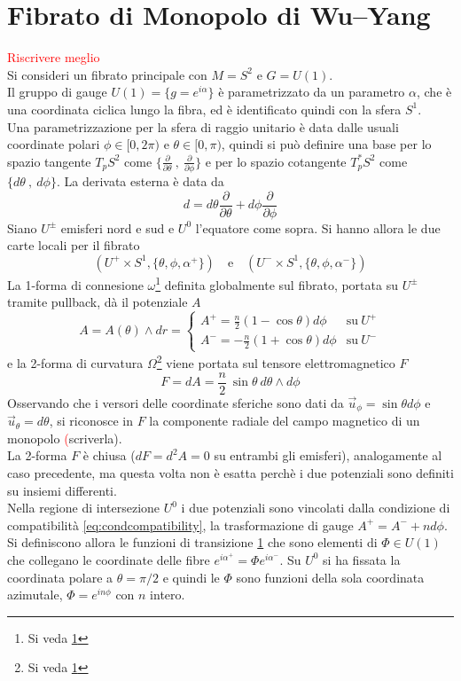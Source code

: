 \section{Fibrato di Monopolo di Wu–Yang}
\textcolor{red}{Riscrivere meglio}\\
Si consideri un fibrato principale con $M = S^2$ e $G = U(1)$.\\
Il gruppo di gauge $U(1) = \{g = e^{i\alpha} \}$ è parametrizzato da un
parametro $\alpha$, che è una coordinata ciclica lungo la fibra, ed è identificato
quindi con la sfera $S^1$.\\
Una parametrizzazione per la sfera di raggio unitario è data dalle usuali
coordinate polari $\phi \in[0,2\pi)$ e $\theta \in [0,\pi)$,
quindi si può definire una base per lo spazio tangente $T_pS^2$ come
$\{ \frac{\partial}{\partial \theta} \: , \: \frac{\partial}{\partial \phi } \}$
e per lo spazio cotangente $T^*_pS^2$ come $\{ d\theta \: , \: d\phi \}$.
La derivata esterna è data da
$$
   d = d\theta \frac{\partial}{\partial \theta}
     + d\phi   \frac{\partial}{\partial \phi }
$$
Siano $U^\pm$ emisferi nord e sud e $U^0$ l'equatore come sopra.
Si hanno allora le due carte locali per il fibrato
$$
   ( U^+ \times S^1 , \{ \theta, \phi,\alpha^+ \} ) \quad \mathrm{e}\quad
   ( U^- \times S^1 , \{ \theta, \phi,\alpha^- \} )
$$
La 1-forma di connesione $\omega$\footnote{Si veda \ref{}}
definita globalmente sul fibrato, portata su $U^\pm$ tramite pullback,
dà il potenziale $A$
$$
   A = A(\theta)\wedge dr =  \begin{cases}
      A^+ =  \frac{n}{2}(1 - \cos\theta ) d\phi & \mathrm{su \:} U^+ \\
      A^- = -\frac{n}{2}(1 + \cos\theta ) d\phi & \mathrm{su \:} U^-
   \end{cases}
$$
e la 2-forma di curvatura $\Omega$\footnote{Si veda \ref{}} viene portata
sul tensore elettromagnetico $F$
$$
   F = dA = \frac{n}{2} \: \sin\theta \: d\theta \wedge d\phi
$$
Osservando che i versori delle coordinate sferiche sono dati da
$\vec u _\phi = \sin\theta d\phi$ e $ \vec u _\theta = d\theta$, si riconosce in
$F$ la componente radiale del campo magnetico di un monopolo
{\textcolor{red}(scriverla)}.\\

La 2-forma $F$ è chiusa ($dF = d^2A = 0$ su entrambi gli emisferi),
analogamente al caso precedente, ma questa volta non è esatta perchè i due potenziali
sono definiti su insiemi differenti.\\

Nella regione di intersezione $U^0$ i due potenziali sono vincolati dalla condizione
di compatibilità \ref{eq:condcompatibility}, la trasformazione di gauge
$A^+ = A^- + n d \phi$. Si definiscono allora le funzioni di transizione \ref{}
che sono elementi di $\Phi \in U(1)$ che collegano le coordinate delle fibre
$e^{i\alpha^+} = \Phi e^{i\alpha^-}$. Su $U^0$ si ha fissata la coordinata polare
a $\theta = \pi/2$ e quindi le $\Phi$ sono funzioni della sola coordinata azimutale,
$ \Phi = e^{in\phi}$ con $n$ intero.\\

